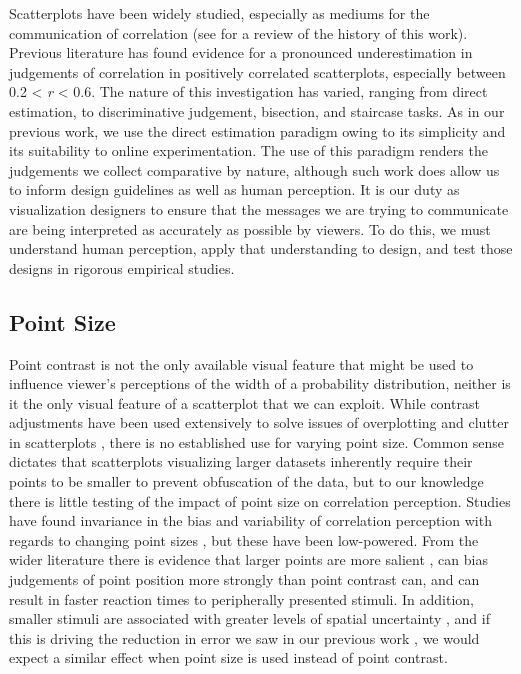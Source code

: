 \documentclass{vgtc}                          %
\begin{document}
Scatterplots have been widely studied, especially as mediums for the communication
of correlation (see \cite{strain_2023} for a review of the history of this work).
Previous literature has found evidence for a pronounced underestimation in judgements
of correlation in positively correlated scatterplots, especially between 0.2 \textless{} \emph{r} \textless{} 0.6. The
nature of this investigation has varied, ranging from direct estimation,
to discriminative judgement, bisection, and staircase tasks. As in our previous work,
we use the direct estimation paradigm owing to its simplicity and its suitability
to online experimentation. The use of this paradigm renders the judgements we collect
comparative by nature, although such work does allow us to inform design guidelines as
well as human perception. It is our duty as visualization designers to ensure that the
messages we are trying to communicate are being interpreted as accurately as possible
by viewers. To do this, we must understand human perception, apply that understanding
to design, and test those designs in rigorous empirical studies.

\hypertarget{point-size}{%
\subsection{Point Size}\label{point-size}}

Point contrast is not the only available visual feature that might be used
to influence viewer's perceptions of the width of a probability distribution, neither is
it the only visual feature of a scatterplot that we can exploit. While
contrast adjustments have been used extensively to solve issues of overplotting and clutter
in scatterplots \cite{matejka_2015, bertini_2004}, there is no established use for
varying point size. Common sense dictates that scatterplots visualizing larger
datasets inherently require their points to be smaller to prevent obfuscation of the data,
but to our knowledge there is little testing of the impact of point size on correlation perception.
Studies have found invariance in the bias and variability of correlation
perception with regards to changing point sizes \cite{rensink_2012, rensink_2014},
but these have been low-powered. From the wider literature there is evidence that larger points
are more salient \cite{healey_2012}, can bias judgements of point position
\cite{hong_2021} more strongly than point contrast can, and can result in faster reaction times \cite{grice_1983} to peripherally presented stimuli. In addition, smaller stimuli are associated with
greater levels of spatial uncertainty \cite{alais_2004}, and if this
is driving the reduction in error we saw in our previous work \cite{strain_2023},
we would expect a similar effect when point size is used instead of point contrast.
\end{document}
